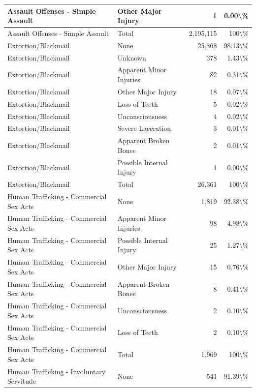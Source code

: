 \documentclass[
]{krantz}
\begin{document}
\begin{longtable}[t]{l|l|r|r}
\hline
Assault Offenses - Simple Assault & Other Major Injury & 1 & 0.00\textbackslash{}\%\\
\hline
Assault Offenses - Simple Assault & Total & 2,195,115 & 100\textbackslash{}\%\\
\hline
Extortion/Blackmail & None & 25,868 & 98.13\textbackslash{}\%\\
\hline
Extortion/Blackmail & Unknown & 378 & 1.43\textbackslash{}\%\\
\hline
Extortion/Blackmail & Apparent Minor Injuries & 82 & 0.31\textbackslash{}\%\\
\hline
Extortion/Blackmail & Other Major Injury & 18 & 0.07\textbackslash{}\%\\
\hline
Extortion/Blackmail & Loss of Teeth & 5 & 0.02\textbackslash{}\%\\
\hline
Extortion/Blackmail & Unconsciousness & 4 & 0.02\textbackslash{}\%\\
\hline
Extortion/Blackmail & Severe Laceration & 3 & 0.01\textbackslash{}\%\\
\hline
Extortion/Blackmail & Apparent Broken Bones & 2 & 0.01\textbackslash{}\%\\
\hline
Extortion/Blackmail & Possible Internal Injury & 1 & 0.00\textbackslash{}\%\\
\hline
Extortion/Blackmail & Total & 26,361 & 100\textbackslash{}\%\\
\hline
Human Trafficking - Commercial Sex Acts & None & 1,819 & 92.38\textbackslash{}\%\\
\hline
Human Trafficking - Commercial Sex Acts & Apparent Minor Injuries & 98 & 4.98\textbackslash{}\%\\
\hline
Human Trafficking - Commercial Sex Acts & Possible Internal Injury & 25 & 1.27\textbackslash{}\%\\
\hline
Human Trafficking - Commercial Sex Acts & Other Major Injury & 15 & 0.76\textbackslash{}\%\\
\hline
Human Trafficking - Commercial Sex Acts & Apparent Broken Bones & 8 & 0.41\textbackslash{}\%\\
\hline
Human Trafficking - Commercial Sex Acts & Unconsciousness & 2 & 0.10\textbackslash{}\%\\
\hline
Human Trafficking - Commercial Sex Acts & Loss of Teeth & 2 & 0.10\textbackslash{}\%\\
\hline
Human Trafficking - Commercial Sex Acts & Total & 1,969 & 100\textbackslash{}\%\\
\hline
Human Trafficking - Involuntary Servitude & None & 541 & 91.39\textbackslash{}\%\\

\end{longtable}
\end{document}
